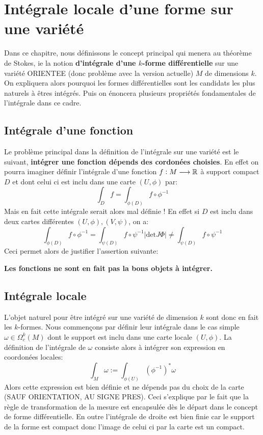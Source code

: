 \chapter{Intégrale locale d'une forme sur une variété}
Dans ce chapitre, nous définissons le concept principal qui menera au théorème de Stokes, ie la notion \textbf{d'intégrale d'une \( k \)-forme différentielle} sur une variété ORIENTEE (donc problème avec la version actuelle) \( M \) de dimensions \( k \). On expliquera alors pourquoi les formes différentielles sont les candidats les plus naturels à êtres intégrés. Puis on énoncera plusieurs propriétés fondamentales de l'intégrale dans ce cadre.
\section{Intégrale d'une fonction}
Le problème principal dans la définition de l'intégrale sur une variété est le suivant, \textbf{intégrer une fonction dépends des cordonées choisies}. En effet on pourra imaginer définir l'intégrale d'une fonction \( f : M \longrightarrow \mathbb{R} \) à support compact \( D \) et dont celui ci est inclu dans une carte \((U, \phi)\) par:
\[ 
   \int_D f = \int_{\phi(D)} f  \circ \phi^{-1} 
\] 
Mais en fait cette intégrale serait alors mal définie ! En effet si \( D \) est inclu dans deux cartes différentes \( (U, \phi), (V, \psi) \), on a:
\[ 
   \int_{\phi(D)} f \circ \phi^{-1} = \int_{\psi(D)} f \circ \psi^{-1} \left|\text{det}J\Phi\right| \neq \int_{\psi(D)} f \circ \psi^{-1}
\]
Ceci permet alors de justifier l'assertion suivante:
\begin{center}
   \textbf{Les fonctions ne sont en fait pas la bons objets à intégrer.}   
\end{center}


\section{Intégrale locale}
L'objet naturel pour être intégré sur une variété de dimension \( k \) sont donc en fait les \( k \)-formes. Nous commençons par définir leur intégrale dans le cas simple \( \omega \in \Omega^k_c(M) \) dont le support est inclu dans une carte locale \( (U, \phi) \). La définition de l'intégrale de \( \omega \) consiste alors à intégrer son expression en coordonées locales:
\[ 
   \int_M \omega := \int_{ \phi(U)} (\phi^{-1})^*\omega 
\]
Alors cette expression est bien définie et ne dépends pas du choix de la carte (SAUF ORIENTATION, AU SIGNE PRES). Ceci s'explique par le fait que la règle de transformation de la mesure est encapsulée dès le départ dans le concept de forme différentielle. En outre l'intégrale de droite est bien finie car le support de la forme est compact donc l'image de celui ci par la carte est un compact.
\pagebreak
